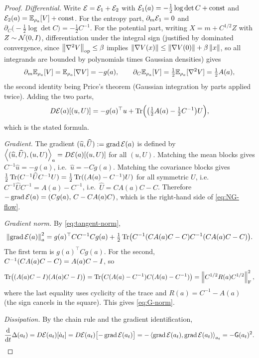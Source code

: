 \begin{proof}
\emph{Differential.} Write $\mathcal{E}=\mathcal{E}_1+\mathcal{E}_2$ with
$\mathcal{E}_1(a)=-\tfrac12\log\det C+\mathrm{const}$ and
$\mathcal{E}_2(a)=\mathbb{E}_{\rho_a}[V]+\mathrm{const}$. For the entropy part,
$\partial_m\mathcal{E}_1=0$ and
$\partial_C\bigl(-\tfrac12\log\det C\bigr)=-\tfrac12C^{-1}$. For the potential part,
writing $X=m+C^{1/2}Z$ with $Z\sim\mathcal{N}(0,I)$, differentiation under the integral sign
(justified by dominated convergence, since $\left\lVert \nabla^2V\right\rVert_{\mathrm{op}}\leq\beta$ implies
$\left\lVert \nabla V(x)\right\rVert\leq\left\lVert \nabla V(0)\right\rVert+\beta\left\lVert x\right\rVert$, so all integrands are bounded
by polynomials times Gaussian densities) gives
\[
    \partial_m\mathbb{E}_{\rho_a}[V]=\mathbb{E}_{\rho_a}[\nabla V]=-g(a),
    \qquad
    \partial_C\mathbb{E}_{\rho_a}[V]=\tfrac12\mathbb{E}_{\rho_a}[\nabla^2V]=\tfrac12A(a),
\]
the second identity being Price's theorem (Gaussian integration by parts applied twice).
Adding the two parts,
\[
    D\mathcal{E}(a)[(u,U)]
    =
    -g(a)^\top u
    +
    \operatorname{Tr}\Bigl(\bigl(\tfrac12A(a)-\tfrac12C^{-1}\bigr)U\Bigr),
\]
which is the stated formula.

\emph{Gradient.} The gradient $(\widehat u,\widehat U):=\operatorname{grad}\mathcal{E}(a)$ is defined by
$\left\langle (\widehat u,\widehat U),(u,U)\right\rangle_a=D\mathcal{E}(a)[(u,U)]$ for all $(u,U)$. Matching the
mean blocks gives $C^{-1}\widehat u=-g(a)$, i.e.\ $\widehat u=-Cg(a)$. Matching the
covariance blocks gives
$\tfrac12\operatorname{Tr}(C^{-1}\widehat UC^{-1}U)=\tfrac12\operatorname{Tr}((A(a)-C^{-1})U)$ for all symmetric $U$,
i.e.\ $C^{-1}\widehat UC^{-1}=A(a)-C^{-1}$, i.e.\ $\widehat U=CA(a)C-C$. Therefore
$-\operatorname{grad}\mathcal{E}(a)=(Cg(a),\,C-CA(a)C)$, which is the right-hand side of \eqref{eq:NG-flow}.

\emph{Gradient norm.} By \eqref{eq:tangent-norm},
\[
    \left\lVert \operatorname{grad}\mathcal{E}(a)\right\rVert_a^2
    =
    g(a)^\top CC^{-1}Cg(a)
    +
    \tfrac12\operatorname{Tr}\bigl(C^{-1}(CA(a)C-C)C^{-1}(CA(a)C-C)\bigr).
\]
The first term is $g(a)^\top Cg(a)$. For the second, $C^{-1}(CA(a)C-C)=A(a)C-I$, so
\[
    \operatorname{Tr}\bigl((A(a)C-I)(A(a)C-I)\bigr)
    =
    \operatorname{Tr}\bigl(C(A(a)-C^{-1})C(A(a)-C^{-1})\bigr)
    =
    \left\lVert C^{1/2}R(a)C^{1/2}\right\rVert_{\mathrm{F}}^2,
\]
where the last equality uses cyclicity of the trace and $R(a)=C^{-1}-A(a)$ (the sign
cancels in the square). This gives \eqref{eq:G-norm}.

\emph{Dissipation.} By the chain rule and the gradient identification,
\[
    \frac{\mathrm{d}}{\mathrm{d} t}\Delta(a_t)
    =
    D\mathcal{E}(a_t)[\dot a_t]
    =
    D\mathcal{E}(a_t)\bigl[-\operatorname{grad}\mathcal{E}(a_t)\bigr]
    =
    -\left\langle \operatorname{grad}\mathcal{E}(a_t),\operatorname{grad}\mathcal{E}(a_t)\right\rangle_{a_t}
    =
    -\mathsf{G}(a_t)^2 .
    \qedhere
\]
\end{proof}

